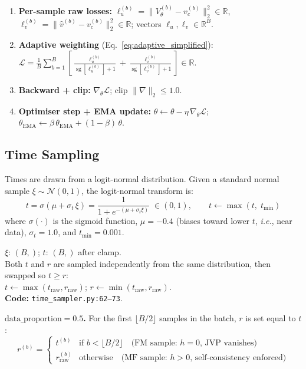 \documentclass[11pt,a4paper]{article}
\newcommand{\EMA}{\mathrm{EMA}}
\newcommand{\ie}{\textit{i.e.}}
\newcommand{\code}[1]{\texttt{#1}}
\DeclareMathOperator{\sg}{sg}        %
\begin{document}
\begin{enumerate}[nosep, leftmargin=2em]
  \item \textbf{Per-sample raw losses:}
    $\ell_u^{(b)} = \|V_\theta^{(b)} - v_c^{(b)}\|_2^2 \in \mathbb{R}$,
    $\ell_v^{(b)} = \|\hat{v}^{(b)} - v_c^{(b)}\|_2^2 \in \mathbb{R}$;
    vectors $\boldsymbol{\ell}_u, \boldsymbol{\ell}_v \in \mathbb{R}^B$.

  \item \textbf{Adaptive weighting} (Eq.~\ref{eq:adaptive_simplified}):
    $\mathcal{L} = \frac{1}{B}\sum_{b=1}^{B}\!\left[
      \frac{\ell_u^{(b)}}{\sg[\ell_u^{(b)}]+1}
      + \frac{\ell_v^{(b)}}{\sg[\ell_v^{(b)}]+1}
    \right] \in \mathbb{R}$.

  \item \textbf{Backward + clip:}
    $\nabla_\theta \mathcal{L}$; clip
    $\|\nabla\|_2 \le 1.0$.

  \item \textbf{Optimiser step + EMA update:}
    $\theta \leftarrow \theta - \eta\,\nabla_\theta \mathcal{L}$;
    $\theta_\EMA \leftarrow \beta\,\theta_\EMA + (1-\beta)\,\theta$.
\end{enumerate}

\subsection{Time Sampling}
\label{sec:time_sampling}

Times are drawn from a logit-normal distribution.  Given a standard normal
sample $\xi \sim \mathcal{N}(0,1)$, the logit-normal transform is:
\begin{equation}
  t = \sigma(\mu + \sigma_t\,\xi)
    = \frac{1}{1 + e^{-(\mu + \sigma_t \xi)}}
    \;\in (0,1),
  \qquad
  t \leftarrow \max(t,\;t_{\min})
  \label{eq:time_sampling}
\end{equation}
where $\sigma(\cdot)$ is the sigmoid function, $\mu = -0.4$ (biases toward
lower $t$, \ie, near data), $\sigma_t = 1.0$, and $t_{\min} = 0.001$.
\begin{shapes}
$\xi$: $(B,)$; $t$: $(B,)$ after clamp.\\
Both $t$ and $r$ are sampled independently from the same distribution,
then swapped so $t \ge r$:\\
$t \leftarrow \max(t_\mathrm{raw}, r_\mathrm{raw})$;
$r \leftarrow \min(t_\mathrm{raw}, r_\mathrm{raw})$.\\
\textbf{Code:} \code{time\_sampler.py:62--73}.
\end{shapes}

\textbf{$\mathrm{data\_proportion} = 0.5$.}  For the first $\lfloor B/2
\rfloor$ samples in the batch, $r$ is set equal to $t$:
\begin{equation}
  r^{(b)} =
  \begin{cases}
    t^{(b)} & \text{if } b < \lfloor B/2 \rfloor
      \quad\text{(FM sample: }h = 0\text{, JVP vanishes)} \\
    r^{(b)}_{\mathrm{raw}} & \text{otherwise}
      \quad\text{(MF sample: }h > 0\text{, self-consistency enforced)}
  \end{cases}
  \label{eq:data_proportion}
\end{equation}
\end{document}
